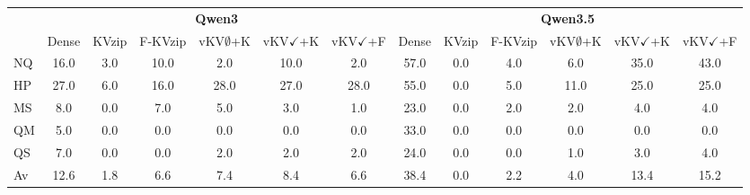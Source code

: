 \begin{tabular}{l|cccccc|cccccc}
\toprule
 & \multicolumn{6}{c|}{\textbf{Qwen3}} & \multicolumn{6}{c}{\textbf{Qwen3.5}} \\
 & Dense & KVzip & F-KVzip & vKV$\emptyset$+K & vKV$\checkmark$+K & vKV$\checkmark$+F & Dense & KVzip & F-KVzip & vKV$\emptyset$+K & vKV$\checkmark$+K & vKV$\checkmark$+F \\
\midrule
NQ & 16.0 & 3.0 & 10.0 & 2.0 & 10.0 & 2.0 & 57.0 & 0.0 & 4.0 & 6.0 & 35.0 & 43.0 \\
HP & 27.0 & 6.0 & 16.0 & 28.0 & 27.0 & 28.0 & 55.0 & 0.0 & 5.0 & 11.0 & 25.0 & 25.0 \\
MS & 8.0 & 0.0 & 7.0 & 5.0 & 3.0 & 1.0 & 23.0 & 0.0 & 2.0 & 2.0 & 4.0 & 4.0 \\
QM & 5.0 & 0.0 & 0.0 & 0.0 & 0.0 & 0.0 & 33.0 & 0.0 & 0.0 & 0.0 & 0.0 & 0.0 \\
QS & 7.0 & 0.0 & 0.0 & 2.0 & 2.0 & 2.0 & 24.0 & 0.0 & 0.0 & 1.0 & 3.0 & 4.0 \\
\midrule
Av & 12.6 & 1.8 & 6.6 & 7.4 & 8.4 & 6.6 & 38.4 & 0.0 & 2.2 & 4.0 & 13.4 & 15.2 \\
\bottomrule
\end{tabular}
